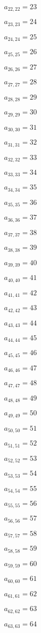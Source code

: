 \documentclass[a4paper,12pt]{article}
\begin{document}
$a _{ 22, 22 } = 23$

$a _{ 23, 23 } = 24$

$a _{ 24, 24 } = 25$

$a _{ 25, 25 } = 26$

$a _{ 26, 26 } = 27$

$a _{ 27, 27 } = 28$

$a _{ 28, 28 } = 29$

$a _{ 29, 29 } = 30$

$a _{ 30, 30 } = 31$

$a _{ 31, 31 } = 32$

$a _{ 32, 32 } = 33$

$a _{ 33, 33 } = 34$

$a _{ 34, 34 } = 35$

$a _{ 35, 35 } = 36$

$a _{ 36, 36 } = 37$

$a _{ 37, 37 } = 38$

$a _{ 38, 38 } = 39$

$a _{ 39, 39 } = 40$

$a _{ 40, 40 } = 41$

$a _{ 41, 41 } = 42$

$a _{ 42, 42 } = 43$

$a _{ 43, 43 } = 44$

$a _{ 44, 44 } = 45$

$a _{ 45, 45 } = 46$

$a _{ 46, 46 } = 47$

$a _{ 47, 47 } = 48$

$a _{ 48, 48 } = 49$

$a _{ 49, 49 } = 50$

$a _{ 50, 50 } = 51$

$a _{ 51, 51 } = 52$

$a _{ 52, 52 } = 53$

$a _{ 53, 53 } = 54$

$a _{ 54, 54 } = 55$

$a _{ 55, 55 } = 56$

$a _{ 56, 56 } = 57$

$a _{ 57, 57 } = 58$

$a _{ 58, 58 } = 59$

$a _{ 59, 59 } = 60$

$a _{ 60, 60 } = 61$

$a _{ 61, 61 } = 62$

$a _{ 62, 62 } = 63$

$a _{ 63, 63 } = 64$
\end{document}
